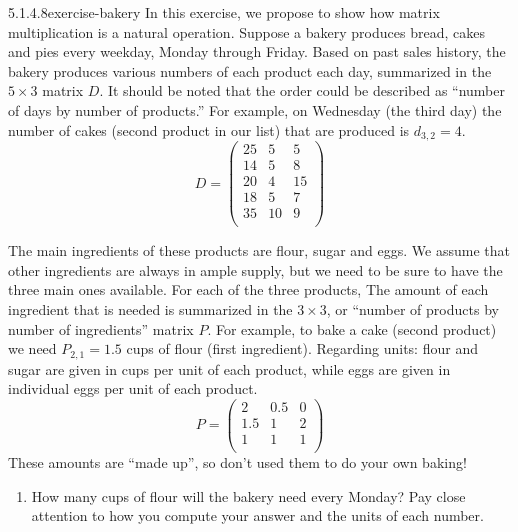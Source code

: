 \documentclass[twoside,10pt,]{book}
\numberwithin{equation}{section}
\begin{document}
\begin{divisionsolution}{5.1.4.8}{}{exercise-bakery}%
\hypertarget{p-1783}{}%
In this exercise, we propose to show how matrix multiplication is a natural operation.  Suppose a bakery produces bread, cakes and pies every weekday, Monday through Friday. Based on past sales history, the bakery produces various numbers of each product each day, summarized in the \(5 \times 3\) matrix \(D\).  It should be noted that the order could be described as ``number of days by number of products.''   For example, on Wednesday (the third day) the number of cakes (second product in our list) that are produced  is  \(d_{3,2} = 4\).%
\begin{equation*}
D =\left(
\begin{array}{ccc}
25 & 5 & 5 \\
14 & 5 & 8 \\
20 & 4 & 15 \\
18 & 5 & 7 \\
35 & 10 & 9 \\
\end{array}
\right)
\end{equation*}
%
\par
\hypertarget{p-1784}{}%
The main ingredients of these products are flour, sugar and eggs. We assume that other ingredients are always in ample supply, but we need to be sure to have the three main ones available.   For each of the three products, The amount of each ingredient that is needed is summarized in the \(3 \times 3\), or ``number of products by number of ingredients'' matrix \(P\).  For example, to bake a cake (second product) we need \(P_{2,1}=1.5\) cups of flour (first ingredient).  Regarding units: flour and sugar are given in cups per unit of each product, while eggs are given in individual eggs per unit of each product.%
\begin{equation*}
P =\left(
\begin{array}{ccc}
2 & 0.5 & 0 \\
1.5 & 1 & 2 \\
1 & 1 & 1  \\
\end{array}
\right)
\end{equation*}
These amounts are ``made up'', so don't used them to do your own baking!%
\par
\hypertarget{p-1785}{}%
\leavevmode%
\begin{enumerate}[label=(\alph*)]
\item\hypertarget{li-944}{}\hypertarget{p-1786}{}%
How many cups of flour will the bakery need every Monday?  Pay close attention to how you compute your answer and the units of each number.%

\end{enumerate}
\end{divisionsolution}
\end{document}
